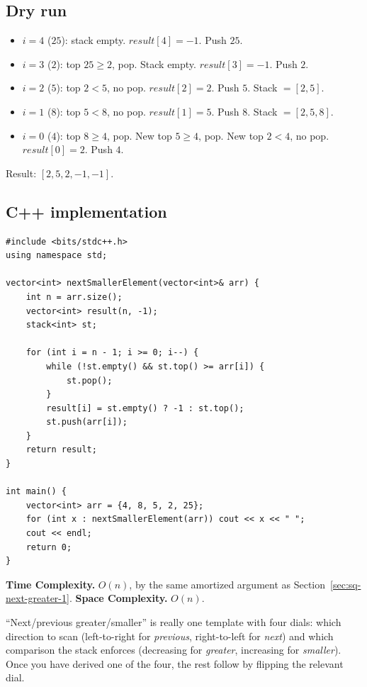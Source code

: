 \subsection*{Dry run}


\begin{itemize}
  \item $i=4$ ($25$): stack empty. $\textit{result}[4]=-1$. Push $25$.
  \item $i=3$ ($2$): top $25\ge2$, pop. Stack empty.
        $\textit{result}[3]=-1$. Push $2$.
  \item $i=2$ ($5$): top $2<5$, no pop. $\textit{result}[2]=2$. Push
        $5$. Stack $=[2,5]$.
  \item $i=1$ ($8$): top $5<8$, no pop. $\textit{result}[1]=5$. Push
        $8$. Stack $=[2,5,8]$.
  \item $i=0$ ($4$): top $8\ge4$, pop. New top $5\ge4$, pop. New top
        $2<4$, no pop. $\textit{result}[0]=2$. Push $4$.
\end{itemize}

Result: $[2,5,2,-1,-1]$.

\subsection*{C++ implementation}

\begin{lstlisting}
#include <bits/stdc++.h>
using namespace std;

vector<int> nextSmallerElement(vector<int>& arr) {
    int n = arr.size();
    vector<int> result(n, -1);
    stack<int> st;

    for (int i = n - 1; i >= 0; i--) {
        while (!st.empty() && st.top() >= arr[i]) {
            st.pop();
        }
        result[i] = st.empty() ? -1 : st.top();
        st.push(arr[i]);
    }
    return result;
}

int main() {
    vector<int> arr = {4, 8, 5, 2, 25};
    for (int x : nextSmallerElement(arr)) cout << x << " ";
    cout << endl;
    return 0;
}
\end{lstlisting}

\begin{complexitybox}
\textbf{Time Complexity.} $O(n)$, by the same amortized argument as
Section~\ref{sec:sq-next-greater-1}.
\textbf{Space Complexity.} $O(n)$.
\end{complexitybox}

\begin{takeawaybox}
``Next/previous greater/smaller'' is really one template with four
dials: which direction to scan (left-to-right for \emph{previous},
right-to-left for \emph{next}) and which comparison the stack enforces
(decreasing for \emph{greater}, increasing for \emph{smaller}). Once you
have derived one of the four, the rest follow by flipping the relevant
dial.
\end{takeawaybox}
